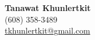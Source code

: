\documentclass[11pt]{article}
\begin{document}
\begin{center}
{\LARGE \textbf{Tanawat Khunlertkit}}\\
(608) 358-3489 \\
\href{mailto:tkhunlertkit@gmail.com}{tkhunlertkit@gmail.com}\\

\end{center}
\vspace{-1.5em}


\end{document}
